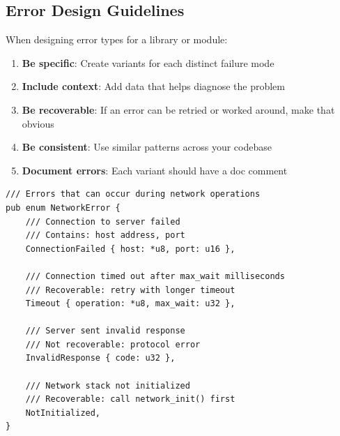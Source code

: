 \subsection{Error Design Guidelines}

When designing error types for a library or module:

\begin{enumerate}
    \item \textbf{Be specific}: Create variants for each distinct failure mode
    \item \textbf{Include context}: Add data that helps diagnose the problem
    \item \textbf{Be recoverable}: If an error can be retried or worked around, make that obvious
    \item \textbf{Be consistent}: Use similar patterns across your codebase
    \item \textbf{Document errors}: Each variant should have a doc comment
\end{enumerate}

\begin{lstlisting}
/// Errors that can occur during network operations
pub enum NetworkError {
    /// Connection to server failed
    /// Contains: host address, port
    ConnectionFailed { host: *u8, port: u16 },

    /// Connection timed out after max_wait milliseconds
    /// Recoverable: retry with longer timeout
    Timeout { operation: *u8, max_wait: u32 },

    /// Server sent invalid response
    /// Not recoverable: protocol error
    InvalidResponse { code: u32 },

    /// Network stack not initialized
    /// Recoverable: call network_init() first
    NotInitialized,
}
\end{lstlisting}
